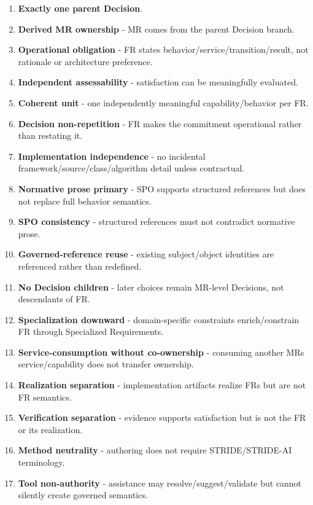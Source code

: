 \documentclass[
  10pt,
]{article}
\providecommand{\tightlist}{%
  \setlength{\itemsep}{0pt}\setlength{\parskip}{0pt}}
\begin{document}
\begin{enumerate}
\def\labelenumi{\arabic{enumi}.}
\tightlist
\item
  \textbf{Exactly one parent Decision}.
\item
  \textbf{Derived MR ownership} - MR comes from the parent Decision
  branch.
\item
  \textbf{Operational obligation} - FR states
  behavior/service/transition/result, not rationale or architecture
  preference.
\item
  \textbf{Independent assessability} - satisfaction can be meaningfully
  evaluated.
\item
  \textbf{Coherent unit} - one independently meaningful
  capability/behavior per FR.
\item
  \textbf{Decision non-repetition} - FR makes the commitment operational
  rather than restating it.
\item
  \textbf{Implementation independence} - no incidental
  framework/source/class/algorithm detail unless contractual.
\item
  \textbf{Normative prose primary} - SPO supports structured references
  but does not replace full behavior semantics.
\item
  \textbf{SPO consistency} - structured references must not contradict
  normative prose.
\item
  \textbf{Governed-reference reuse} - existing subject/object identities
  are referenced rather than redefined.
\item
  \textbf{No Decision children} - later choices remain MR-level
  Decisions, not descendants of FR.
\item
  \textbf{Specialization downward} - domain-specific constraints
  enrich/constrain FR through Specialized Requirements.
\item
  \textbf{Service-consumption without co-ownership} - consuming another
  MR\textquotesingle s service/capability does not transfer ownership.
\item
  \textbf{Realization separation} - implementation artifacts realize FRs
  but are not FR semantics.
\item
  \textbf{Verification separation} - evidence supports satisfaction but
  is not the FR or its realization.
\item
  \textbf{Method neutrality} - authoring does not require
  STRIDE/STRIDE-AI terminology.
\item
  \textbf{Tool non-authority} - assistance may resolve/suggest/validate
  but cannot silently create governed semantics.
\end{enumerate}
\end{document}
